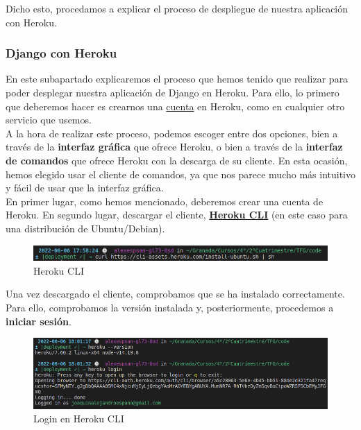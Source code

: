 Dicho esto, procedamos a explicar el proceso de despliegue de nuestra aplicación con Heroku.

\subsubsection{Django con Heroku}
En este subapartado explicaremos el proceso \cite{heroku-with-django} que hemos tenido que
realizar para poder desplegar nuestra aplicación de Django en Heroku. Para ello, lo primero
que deberemos hacer es crearnos una \href{https://id.heroku.com/login}{cuenta} en Heroku,
como en cualquier otro servicio que usemos.\\

A la hora de realizar este proceso, podemos escoger entre dos opciones, bien a través de la
\textbf{interfaz gráfica} que ofrece Heroku, o bien a través de la \textbf{interfaz de
comandos} que ofrece Heroku con la descarga de su cliente. En esta ocasión, hemos elegido usar
el cliente de comandos, ya que nos parece mucho más intuitivo y fácil de usar que la interfaz
gráfica.\\

En primer lugar, como hemos mencionado, deberemos crear una cuenta de Heroku. En segundo
lugar, descargar el cliente, \href{https://shorturl.at/emHJY} {\textbf{Heroku CLI}}
(en este caso para una distribución de Ubuntu/Debian).
        
    \begin{figure}[H]
        \centering
        \includegraphics[scale=0.47]{imagenes/heroku-cli.png}
        \caption{Heroku CLI}
        \label{fig:heroku-cli}
    \end{figure}

Una vez descargado el cliente, comprobamos que se ha instalado correctamente. Para ello,
comprobamos la versión instalada y, posteriormente, procedemos a \textbf{iniciar sesión}.

    \begin{figure}[H]
        \centering
        \includegraphics[scale=0.42]{imagenes/heroku-version-login.png}
        \caption{Login en Heroku CLI}
        \label{fig:heroku-version-login}
    \end{figure}

